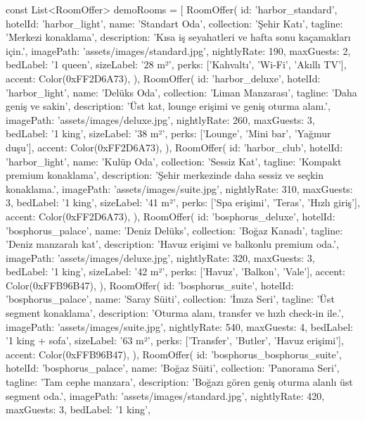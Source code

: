 \documentclass[11pt,a4paper]{article}
\begin{document}
\begin{codeblock}
const List<RoomOffer> demoRooms = [
  RoomOffer(
    id: 'harbor_standard',
    hotelId: 'harbor_light',
    name: 'Standart Oda',
    collection: 'Şehir Katı',
    tagline: 'Merkezi konaklama',
    description: 'Kısa iş seyahatleri ve hafta sonu kaçamakları için.',
    imagePath: 'assets/images/standard.jpg',
    nightlyRate: 190,
    maxGuests: 2,
    bedLabel: '1 queen',
    sizeLabel: '28 m²',
    perks: ['Kahvaltı', 'Wi-Fi', 'Akıllı TV'],
    accent: Color(0xFF2D6A73),
  ),
  RoomOffer(
    id: 'harbor_deluxe',
    hotelId: 'harbor_light',
    name: 'Delüks Oda',
    collection: 'Liman Manzarası',
    tagline: 'Daha geniş ve sakin',
    description: 'Üst kat, lounge erişimi ve geniş oturma alanı.',
    imagePath: 'assets/images/deluxe.jpg',
    nightlyRate: 260,
    maxGuests: 3,
    bedLabel: '1 king',
    sizeLabel: '38 m²',
    perks: ['Lounge', 'Mini bar', 'Yağmur duşu'],
    accent: Color(0xFF2D6A73),
  ),
  RoomOffer(
    id: 'harbor_club',
    hotelId: 'harbor_light',
    name: 'Kulüp Oda',
    collection: 'Sessiz Kat',
    tagline: 'Kompakt premium konaklama',
    description: 'Şehir merkezinde daha sessiz ve seçkin konaklama.',
    imagePath: 'assets/images/suite.jpg',
    nightlyRate: 310,
    maxGuests: 3,
    bedLabel: '1 king',
    sizeLabel: '41 m²',
    perks: ['Spa erişimi', 'Teras', 'Hızlı giriş'],
    accent: Color(0xFF2D6A73),
  ),
  RoomOffer(
    id: 'bosphorus_deluxe',
    hotelId: 'bosphorus_palace',
    name: 'Deniz Delüks',
    collection: 'Boğaz Kanadı',
    tagline: 'Deniz manzaralı kat',
    description: 'Havuz erişimi ve balkonlu premium oda.',
    imagePath: 'assets/images/deluxe.jpg',
    nightlyRate: 320,
    maxGuests: 3,
    bedLabel: '1 king',
    sizeLabel: '42 m²',
    perks: ['Havuz', 'Balkon', 'Vale'],
    accent: Color(0xFFB96B47),
  ),
  RoomOffer(
    id: 'bosphorus_suite',
    hotelId: 'bosphorus_palace',
    name: 'Saray Süiti',
    collection: 'İmza Seri',
    tagline: 'Üst segment konaklama',
    description: 'Oturma alanı, transfer ve hızlı check-in ile.',
    imagePath: 'assets/images/suite.jpg',
    nightlyRate: 540,
    maxGuests: 4,
    bedLabel: '1 king + sofa',
    sizeLabel: '63 m²',
    perks: ['Transfer', 'Butler', 'Havuz erişimi'],
    accent: Color(0xFFB96B47),
  ),
  RoomOffer(
    id: 'bosphorus_bosphorus_suite',
    hotelId: 'bosphorus_palace',
    name: 'Boğaz Süiti',
    collection: 'Panorama Seri',
    tagline: 'Tam cephe manzara',
    description: 'Boğazı gören geniş oturma alanlı üst segment oda.',
    imagePath: 'assets/images/standard.jpg',
    nightlyRate: 420,
    maxGuests: 3,
    bedLabel: '1 king',

\end{codeblock}
\end{document}

